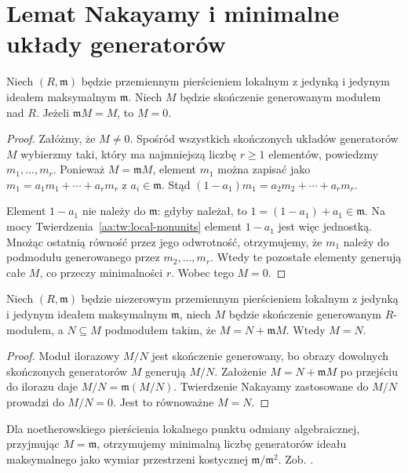 \section{Lemat Nakayamy i minimalne układy generatorów}
\begin{twierdzenie}
\label{aa:tw:nakayama-local}
Niech $(R,\mathfrak m)$ będzie przemiennym pierścieniem
lokalnym z jedynką i jedynym ideałem maksymalnym
$\mathfrak m$. Niech $M$ będzie skończenie generowanym
modułem nad $R$. Jeżeli $\mathfrak m M=M$,
to $M=0$.
\end{twierdzenie}
\begin{proof}
Załóżmy, że $M\ne0$. Spośród wszystkich skończonych
układów generatorów $M$ wybierzmy taki, który ma
najmniejszą liczbę $r\ge1$ elementów,
powiedzmy $m_1,\ldots,m_r$.
Ponieważ $M=\mathfrak m M$, element $m_1$
można zapisać jako
$m_1=a_1m_1+\cdots+a_rm_r$ z $a_i\in\mathfrak m$.
Stąd
$(1-a_1)m_1=a_2m_2+\cdots+a_rm_r$.

Element $1-a_1$ nie należy do $\mathfrak m$:
gdyby należał, to $1=(1-a_1)+a_1\in\mathfrak m$.
Na mocy Twierdzenia~\ref{aa:tw:local-nonunits}
element $1-a_1$ jest więc jednostką.
Mnożąc ostatnią równość przez jego odwrotność,
otrzymujemy, że $m_1$ należy do podmodułu
generowanego przez $m_2,\ldots,m_r$.
Wtedy te pozostałe elementy generują całe $M$,
co przeczy minimalności $r$.
Wobec tego $M=0$.
\end{proof}

\begin{wniosek}
\label{aa:wn:nakayama-submodule}
Niech $(R,\mathfrak m)$ będzie niezerowym przemiennym
pierścieniem lokalnym z jedynką i jedynym ideałem
maksymalnym $\mathfrak m$, niech $M$ będzie skończenie
generowanym $R$-modułem, a
$N\subseteq M$ podmodułem takim, że
$M=N+\mathfrak m M$. Wtedy $M=N$.
\end{wniosek}
\begin{proof}
Moduł ilorazowy $M/N$ jest skończenie generowany,
bo obrazy dowolnych skończonych generatorów $M$
generują $M/N$. Założenie
$M=N+\mathfrak m M$ po przejściu do ilorazu daje
$M/N=\mathfrak m(M/N)$. Twierdzenie Nakayamy
zastosowane do $M/N$ prowadzi do $M/N=0$.
Jest to równoważne $M=N$.
\end{proof}

Dla noetherowskiego pierścienia lokalnego punktu odmiany algebraicznej, przyjmując $M=\mathfrak m$, otrzymujemy minimalną liczbę generatorów ideału maksymalnego jako wymiar przestrzeni kostycznej $\mathfrak m/\mathfrak m^2$. Zob. .

